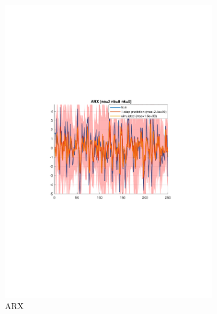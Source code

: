 \documentclass[]{article}
\begin{document}
\begin{figure}[ht]
\centering
\begin{subfigure}{.49\textwidth}
	\centering
	\includegraphics[trim= 10cm 8cm 10cm 8cm, scale=0.4]{figures/3-ARX-Ex1-idcompare.pdf}
	\caption{ARX}
	\label{fig:Ex1-idcompare-ARX}
\end{subfigure}
\begin{subfigure}{.49\textwidth}
	\centering

\end{subfigure}
\end{figure}
\end{document}
